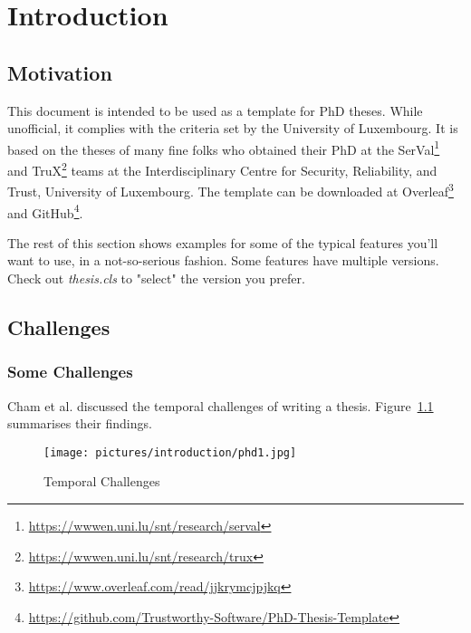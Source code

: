 \chapter{Introduction}
\thispagestyle{empty}
\label{chap:intro}


\section{Motivation}
\label{sec:intro_motiv}
This document is intended to be used as a template for PhD theses. While unofficial, it complies with the criteria set by the University of Luxembourg. It is based on the theses of many fine folks who obtained their PhD at the SerVal\footnote{\url{https://wwwen.uni.lu/snt/research/serval}} and TruX\footnote{\url{https://wwwen.uni.lu/snt/research/trux}} teams at the Interdisciplinary Centre for Security, Reliability, and Trust, University of Luxembourg.
The template can be downloaded at Overleaf\footnote{\url{https://www.overleaf.com/read/jjkrymcjpjkq}} and GitHub\footnote{\url{https://github.com/Trustworthy-Software/PhD-Thesis-Template}}.

The rest of this section shows examples for some of the typical features you'll want to use, in a not-so-serious fashion.
Some features have multiple versions. Check out \textit{thesis.cls} to "select" the version you prefer.


\section{Challenges}
\label{sec:intro_challenge}
\subsection{Some Challenges}


Cham et al.\cite{cham} discussed the temporal challenges of writing a thesis. Figure~\ref{fig:time} summarises their findings.

\begin{figure}[h]
    \centering
    \texttt{[image: pictures/introduction/phd1.jpg]}
    \caption{Temporal Challenges}
    \label{fig:time}
\end{figure}


